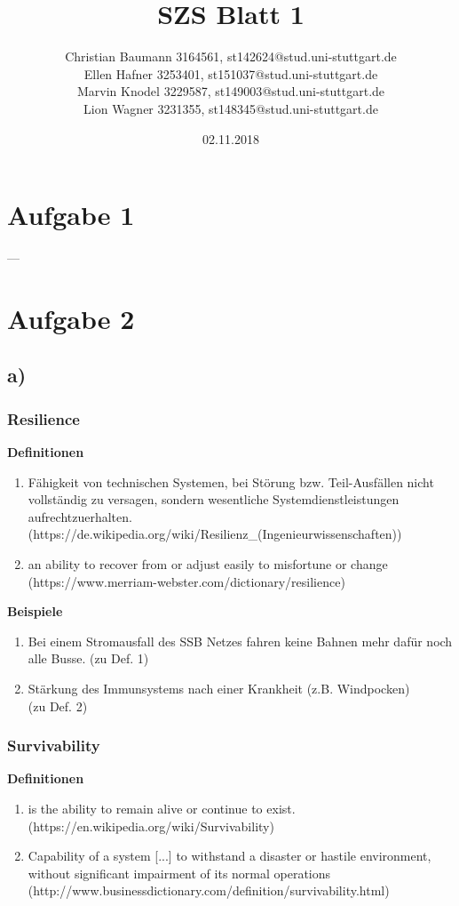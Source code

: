 \documentclass[a4paper, 15pt]{scrartcl}
\title{SZS Blatt 1}
\author{
	Christian Baumann 3164561, st142624@stud.uni-stuttgart.de \\ 
	Ellen Hafner 3253401, st151037@stud.uni-stuttgart.de \\ 
	Marvin Knodel 3229587, st149003@stud.uni-stuttgart.de\\ 
	Lion Wagner 3231355, st148345@stud.uni-stuttgart.de}
\date{02.11.2018}
\begin{document}
	\maketitle
	\newpage
		\mbox{}
		\section*{Aufgabe 1}
		---
	\newpage
	
		\section*{Aufgabe 2}
			\subsection*{a)}
				\subsubsection*{Resilience}
					\textbf{Definitionen}
					\begin{enumerate}
						\item \grqq[...] Fähigkeit von technischen Systemen, bei Störung bzw. Teil-Ausfällen nicht vollständig zu versagen, sondern wesentliche Systemdienstleistungen aufrechtzuerhalten.\grqq \\
						(https://de.wikipedia.org/wiki/Resilienz\_(Ingenieurwissenschaften))
						
						\item \grqq an ability to recover from or adjust easily to misfortune or change\grqq\\ (https://www.merriam-webster.com/dictionary/resilience)
					\end{enumerate}
				
					\textbf{Beispiele}
					\begin{enumerate}
						\item Bei einem Stromausfall des SSB Netzes fahren keine Bahnen mehr dafür noch alle Busse. (zu Def. 1)
					
						\item Stärkung des Immunsystems nach einer Krankheit (z.B. Windpocken) \\(zu Def. 2)
					\end{enumerate}
				
				
				\subsubsection*{Survivability}
					\textbf{Definitionen}
					\begin{enumerate}
						\item \grqq[...] is the ability to remain alive or continue to exist.\grqq \\
						(https://en.wikipedia.org/wiki/Survivability)
					
						\item \grqq Capability of a system [...] to withstand a disaster or hastile environment, without significant impairment of its normal operations\grqq\\ (http://www.businessdictionary.com/definition/survivability.html)
					\end{enumerate}
				
\end{document}

